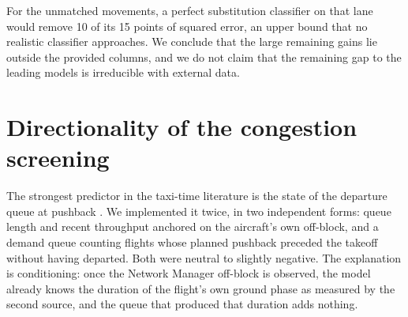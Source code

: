 \documentclass[11pt,a4paper]{article}
\begin{document}
For the unmatched movements, a perfect substitution classifier on that lane
would remove 10 of its 15 points of squared error, an upper bound that no
realistic classifier approaches. We conclude that the large remaining gains
lie outside the provided columns, and we do not claim that the remaining gap
to the leading models is irreducible with external data.

\section{Directionality of the congestion screening}
\label{sec:direction}

The strongest predictor in the taxi-time literature is the state of the
departure queue at pushback \cite{idris2001, ravizza2014}. We implemented it
twice, in two independent forms: queue length and recent throughput anchored
on the aircraft's own off-block, and a demand queue counting flights whose
planned pushback preceded the takeoff without having departed. Both were
neutral to slightly negative. The explanation is conditioning: once the
Network Manager off-block is observed, the model already knows the duration of
the flight's own ground phase as measured by the second source, and the queue
that produced that duration adds nothing.
\end{document}
